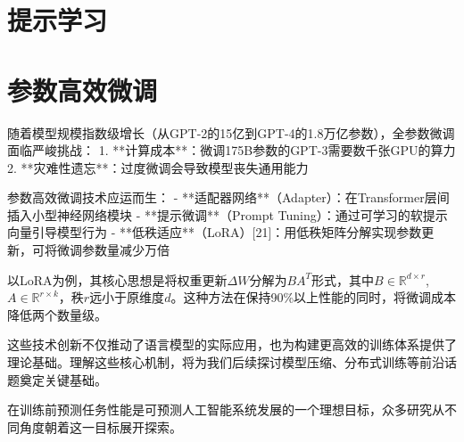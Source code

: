 \section{提示学习}

\section{参数高效微调}
随着模型规模指数级增长（从GPT-2的15亿到GPT-4的1.8万亿参数），全参数微调面临严峻挑战：
1. **计算成本**：微调175B参数的GPT-3需要数千张GPU的算力
2. **灾难性遗忘**：过度微调会导致模型丧失通用能力

参数高效微调技术应运而生：
- **适配器网络**（Adapter）：在Transformer层间插入小型神经网络模块
- **提示微调**（Prompt Tuning）：通过可学习的软提示向量引导模型行为
- **低秩适应**（LoRA）[21]：用低秩矩阵分解实现参数更新，可将微调参数量减少万倍

以LoRA为例，其核心思想是将权重更新$\Delta W$分解为$BA^T$形式，其中$B\in \mathbb{R}^{d\times r}$, $A\in \mathbb{R}^{r\times k}$，秩$r$远小于原维度$d$。这种方法在保持90\%以上性能的同时，将微调成本降低两个数量级。

这些技术创新不仅推动了语言模型的实际应用，也为构建更高效的训练体系提供了理论基础。理解这些核心机制，将为我们后续探讨模型压缩、分布式训练等前沿话题奠定关键基础。


在训练前预测任务性能是可预测人工智能系统发展的一个理想目标，众多研究从不同角度朝着这一目标展开探索。
